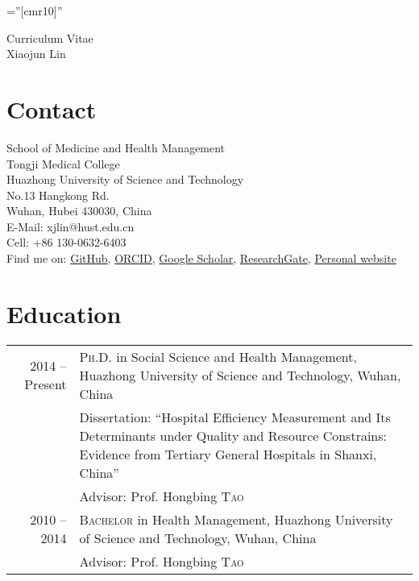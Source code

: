 \documentclass[a4paper,10pt]{article}
\begin{document}
\pagestyle{myheadings}

\font\fb=''[cmr10]'' %

\par{\centering
		{\Huge Curriculum Vitae \\
		\Huge Xiaojun Lin \\
	}\bigskip\par}
	
\thispagestyle{empty} %
 
\section{Contact}
School of Medicine and Health Management\\
Tongji Medical College\\
Huazhong University of Science and Technology\\
No.13 Hangkong Rd.\\
Wuhan, Hubei 430030, China\\
E-Mail: xjlin@hust.edu.cn\\
Cell: +86 130-0632-6403 \\[.2cm]
Find me on: 
\href{https://github.com/xiaojunlin}{GitHub},
\href{https://orcid.org/0000-0003-4284-2401}{ORCID}, \href{https://scholar.google.com/citations?user=ZBGYTowAAAAJ&hl=zh-CN}{Google Scholar}, \href{https://www.researchgate.net/profile/Xiaojun_Lin2}{ResearchGate}, \href{https://xiaojunlin.github.io}{Personal website}
\section{Education}
\begin{tabular}{r p{11cm}}
 2014 -- Present & \textsc{Ph.D.} in Social Science and Health Management, Huazhong University of Science and Technology, Wuhan, China \\
& \small Dissertation: ``Hospital Efficiency Measurement and Its Determinants under Quality and Resource Constrains: Evidence from Tertiary General Hospitals in Shanxi, China''\\
& \small Advisor: Prof. Hongbing \textsc{Tao}\\
 2010 -- 2014 & \textsc{Bachelor} in Health Management, Huazhong University of Science and Technology, Wuhan, China\\
& \small Advisor: Prof. Hongbing \textsc{Tao}\\
\end{tabular}
\end{document}
